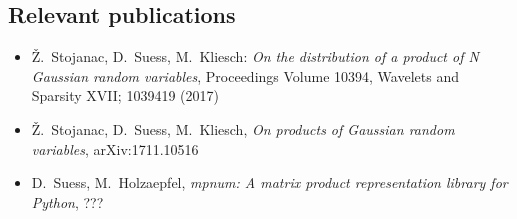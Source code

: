 







\subsection*{Relevant publications}
\begin{itemize}
  \item Ž.\ Stojanac, D.\ Suess, M.\ Kliesch: \textit{On the distribution of a product of N Gaussian random variables}, Proceedings Volume 10394, Wavelets and Sparsity XVII; 1039419 (2017)
  \item Ž.\ Stojanac, D.\ Suess, M.\ Kliesch, \textit{On products of Gaussian random variables}, arXiv:1711.10516
  \item D.\ Suess, M.\ Holzaepfel, \textit{mpnum: A matrix product representation library for Python}, ???
\end{itemize}
